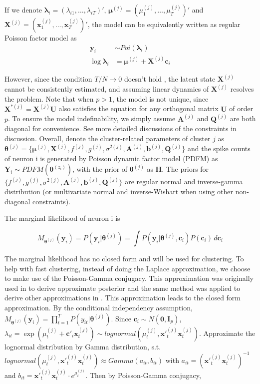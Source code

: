 \documentclass{article}
\begin{document}
	If we denote $\bm{\lambda}_{i} =  (\lambda_{i1},\ldots,\lambda_{iT})'$, $\bm{\mu}^{(j)} = (\mu^{(j)}_1,\ldots,\mu^{(j)}_T)'$ and $\bm{X}^{(j)} = (\bm{x}^{(j)}_1,\ldots,\bm{x}^{(j)}_T)'$, the model can be equivalently written as regular Poisson factor model as
	\begin{align*}
		\bm{y}_i &\sim Poi(\bm{\lambda}_i)\\
		\log\bm{\lambda}_i &= \bm{\mu}^{(j)}+ \bm{X}^{(j)}\bm{c}_i 
	\end{align*}

	However, since the condition $T/N \rightarrow 0$ doesn’t hold \citep{Johnstone2009}, the latent state $\bm{X}^{(j)}$ cannot be consistently estimated, and assuming linear dynamics of $\bm{X}^{(j)}$ resolves the problem. Note that when $p>1$, the model is not unique, since $\bm{X}^{*(j)} = \bm{X}^{(j)}\bm{U}$ also satisfies the equation for any orthogonal matrix $\bm{U}$ of order $p$. To ensure the model indefinability, we simply assume $\bm{A}^{(j)}$ and $\bm{Q}^{(j)}$
	are both diagonal for convenience. See more detailed discussions of the constraints in discussion. Overall, denote the cluster-related parameters of cluster $j$ as $\bm{\theta}^{(j)}= \{\bm{\mu}^{(j)}, \bm{X}^{(j)}, f^{(j)}, g^{(j)}, \sigma^{2(j)},\bm{A}^{(j)}, \bm{b}^{(j)}, \bm{Q}^{(j)}\}$ and the spike counts of neuron i is generated by Poisson dynamic factor model (PDFM) as $\bm{Y}_i\sim PDFM(\bm{\theta}^{(z_i)})$, with the prior of $\bm{\theta}^{(j)}$ as $\bm{H}$. The priors for $\{f^{(j)}, g^{(j)}, \sigma^{2(j)},\bm{A}^{(j)}, \bm{b}^{(j)}, \bm{Q}^{(j)}\}$ are regular  normal and inverse-gamma distribution (or multivariate normal and inverse-Wishart when using other non-diagonal constraints).

	The marginal likelihood of neuron i is
	
	$$M_{\bm{\theta}^{(j)}}(\bm{y}_i) = P(\bm{y}_i|\bm{\theta}^{(j)}) = \int P(\bm{y}_i|\bm{\theta}^{(j)}, \bm{c}_i)P(\bm{c}_i)\,d\bm{c}_i$$
	
	The marginal likelihood has no closed form and will be used for clustering. To help with fast clustering, instead of doing the Laplace approximation, we choose to make use of the Poisson-Gamma conjugacy. This approximation was originally used in \citet{El-Sayyad1973} to derive approximate posterior and the same method was applied to derive other approximations in \citet{Chan2009}. This approximation leads to the closed form approximation. By the conditional independency assumption, $M_{\bm{\theta}^{(j)}}(\bm{y}_i)=\prod_{t=1}^{T}P(y_{it}|\bm{\theta}^{(j)})$. Since $\bm{c}_i\sim N(\bm{0},\bm{I}_p)$, $\lambda_{it} = \exp(\mu_t^{(j)} + \bm{c}'_i\bm{x}^{(j)}_t)\sim lognormal(\mu_t^{(j)}, \bm{x}'^{(j)}_t\bm{x}^{(j)}_t)$. Approximate the lognormal distribution by Gamma distribution, s.t. $lognormal(\mu_t^{(j)}, \bm{x}'^{(j)}_t\bm{x}^{(j)}_t) \approx Gamma(a_{it}, b_{it})$ with $a_{it} = (\bm{x}'^{(j)}_t\bm{x}^{(j)}_t)^{-1}$ and $b_{it} = \bm{x}'^{(j)}_t\bm{x}^{(j)}_t\cdot e^{\mu_t^{(j)}}$. Then by Poisson-Gamma conjugacy,
	
\end{document}
